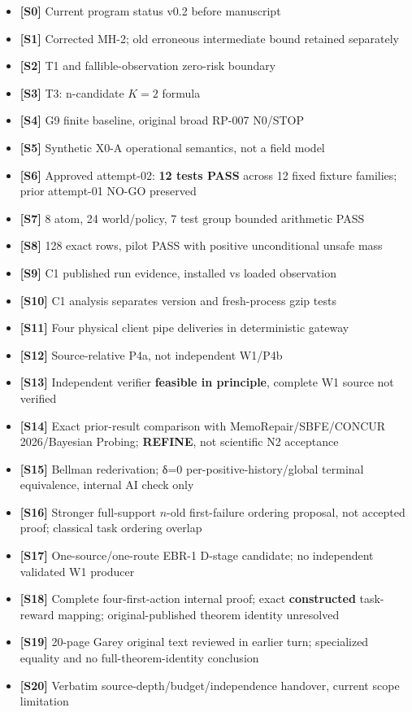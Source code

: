 \documentclass[
  10pt,
  american,
  a4paper,
]{article}
\providecommand{\tightlist}{%
  \setlength{\itemsep}{0pt}\setlength{\parskip}{0pt}}
\begin{document}
\begin{itemize}
\tightlist
\item
  \textbf{{[}S0{]}} Current program status v0.2 before manuscript
\item
  \textbf{{[}S1{]}} Corrected MH-2; old erroneous intermediate bound
  retained separately
\item
  \textbf{{[}S2{]}} T1 and fallible-observation zero-risk boundary
\item
  \textbf{{[}S3{]}} T3: n-candidate \(K=2\) formula
\item
  \textbf{{[}S4{]}} G9 finite baseline, original broad RP-007 N0/STOP
\item
  \textbf{{[}S5{]}} Synthetic X0-A operational semantics, not a field
  model
\item
  \textbf{{[}S6{]}} Approved attempt-02: \textbf{12 tests PASS} across
  12 fixed fixture families; prior attempt-01 NO-GO preserved
\item
  \textbf{{[}S7{]}} 8 atom, 24 world/policy, 7 test group bounded
  arithmetic PASS
\item
  \textbf{{[}S8{]}} 128 exact rows, pilot PASS with positive
  unconditional unsafe mass
\item
  \textbf{{[}S9{]}} C1 published run evidence, installed vs loaded
  observation
\item
  \textbf{{[}S10{]}} C1 analysis separates version and fresh-process
  gzip tests
\item
  \textbf{{[}S11{]}} Four physical client pipe deliveries in
  deterministic gateway
\item
  \textbf{{[}S12{]}} Source-relative P4a, not independent W1/P4b
\item
  \textbf{{[}S13{]}} Independent verifier \textbf{feasible in
  principle}, complete W1 source not verified
\item
  \textbf{{[}S14{]}} Exact prior-result comparison with
  MemoRepair/SBFE/CONCUR 2026/Bayesian Probing; \textbf{REFINE}, not
  scientific N2 acceptance
\item
  \textbf{{[}S15{]}} Bellman rederivation; δ=0
  per-positive-history/global terminal equivalence, internal AI check
  only
\item
  \textbf{{[}S16{]}} Stronger full-support \(n\)-old first-failure
  ordering proposal, not accepted proof; classical task ordering overlap
\item
  \textbf{{[}S17{]}} One-source/one-route EBR-1 D-stage candidate; no
  independent validated W1 producer
\item
  \textbf{{[}S18{]}} Complete four-first-action internal proof; exact
  \textbf{constructed} task-reward mapping; original-published theorem
  identity unresolved
\item
  \textbf{{[}S19{]}} 20-page Garey original text reviewed in earlier
  turn; specialized equality and no full-theorem-identity conclusion
\item
  \textbf{{[}S20{]}} Verbatim source-depth/budget/independence handover,
  current scope limitation
\end{itemize}
\end{document}
